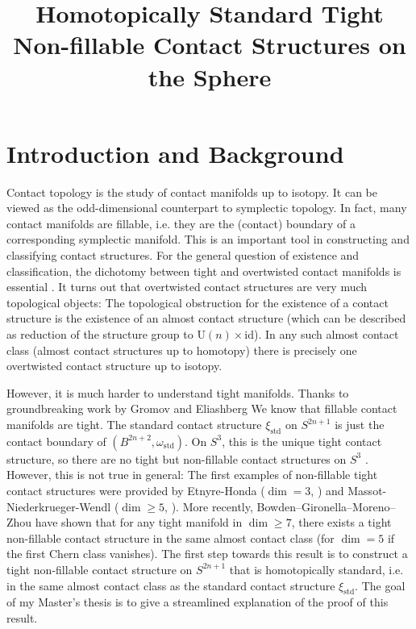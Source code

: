 \documentclass{amsart}
\begin{document}
\title[Homotopically Standard Tight Non-fillable Contact Structures]{Homotopically Standard Tight Non-fillable Contact Structures on the Sphere}
\maketitle
\section*{Introduction and Background}
\noindent Contact topology is the study of contact manifolds up to isotopy. It can be viewed as the
odd-dimensional counterpart to symplectic topology.
In fact, many contact manifolds are fillable, i.e. they are the (contact) boundary of a 
corresponding symplectic  manifold. This is an important tool in constructing and 
classifying contact structures.
For the general question of existence and classification, the dichotomy between tight and 
overtwisted contact manifolds is essential \cite{Eliashberg89,BEM15}.
It turns out that overtwisted contact structures are very much topological objects:
The topological obstruction for the existence of a contact structure is the existence of
an almost contact structure (which can be described as reduction of the structure group to 
$\mathrm U(n) \times \mathrm{id}$). 
In any such almost contact class (almost contact structures up to homotopy) 
there is precisely one overtwisted contact structure up to isotopy.

However, it is much harder to understand tight manifolds.
Thanks to groundbreaking work by Gromov and Eliashberg \cite{Gromov85,Eliashberg91} 
We know that fillable contact manifolds are tight. The standard contact structure 
$\xi_\mathrm{std}$ on $S^{2n+1}$ is just the contact boundary of $(B^{2n+2}, \omega_\mathrm{std})$.
On $S^3$, this is the unique tight contact structure, so there are no tight but non-fillable 
contact structures on $S^3$ \cite{Eliashberg89}. However, this is not true in general:
The first examples of non-fillable tight contact structures were provided by
Etnyre-Honda ($\dim = 3$, \cite{EH02}) and Massot-Niederkrueger-Wendl ($\dim \ge 5$, \cite{MNW13}).
More recently, Bowden--Gironella--Moreno--Zhou \cite{BGMZ22} have shown that for any
tight manifold in $\dim \ge 7$, there exists a tight non-fillable contact structure in
the same almost contact class (for $\dim = 5$ if the first Chern class vanishes). 
The first step towards this result is to construct a tight non-fillable contact structure
on $S^{2n+1}$ that is homotopically standard, i.e. in the same almost contact class
as the standard contact structure $\xi_\mathrm{std}$.
The goal of my Master's thesis is to give a streamlined explanation of the proof of this result.
\end{document}
